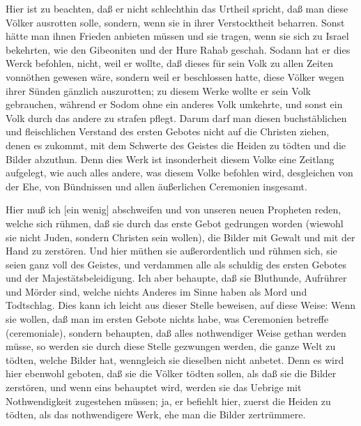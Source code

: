Hier ist zu beachten, daß er nicht schlechthin das Urtheil spricht, daß man diese Völker ausrotten solle, sondern, wenn sie in ihrer Verstocktheit beharren. Sonst hätte man ihnen Frieden anbieten müssen und sie tragen, wenn sie sich zu Israel bekehrten, wie den Gibeoniten und der Hure Rahab geschah. Sodann hat er dies Werck befohlen, nicht, weil er wollte, daß dieses für sein Volk zu allen Zeiten vonnöthen gewesen wäre, sondern weil er beschlossen hatte, diese Völker wegen ihrer Sünden gänzlich auszurotten; zu diesem Werke wollte er sein Volk gebrauchen, während er Sodom ohne ein anderes Volk umkehrte, und sonst ein Volk durch das andere zu strafen pflegt. Darum darf man diesen buchstäblichen und fleischlichen Verstand des ersten Gebotes nicht auf die Christen ziehen, denen es zukommt, mit dem Schwerte des Geistes die Heiden zu tödten und die Bilder abzuthun. Denn dies Werk ist insonderheit diesem Volke eine Zeitlang aufgelegt, wie auch alles andere, was diesem Volke befohlen wird, desgleichen von der Ehe, von Bündnissen und allen äußerlichen Ceremonien insgesamt.

Hier muß ich [ein wenig] abschweifen und von unseren neuen Propheten reden, welche sich rühmen, daß sie durch das erste Gebot gedrungen worden (wiewohl sie nicht Juden, sondern Christen sein wollen), die Bilder mit Gewalt und mit der Hand zu zerstören. Und hier müthen sie außerordentlich und rühmen sich, sie seien ganz voll des Geistes, und verdammen alle als schuldig des ersten Gebotes und der Majestätsbeleidigung. Ich aber behaupte, daß sie Bluthunde, Aufrührer und Mörder sind, welche nichts Anderes im Sinne haben als Mord und Todtschlag. Dies kann ich leicht aus dieser Stelle beweisen, auf diese Weise: Wenn sie wollen, daß man im ersten Gebote nichts habe, was Ceremonien betreffe (ceremoniale), sondern behaupten, daß alles nothwendiger Weise gethan werden müsse, so werden sie durch diese Stelle gezwungen werden, die ganze Welt zu tödten, welche Bilder hat, wenngleich sie dieselben nicht anbetet. Denn es wird hier ebenwohl geboten, daß sie die Völker tödten sollen, als daß sie die Bilder zerstören, und wenn eins behauptet wird, werden sie das Uebrige mit Nothwendigkeit zugestehen müssen; ja, er befiehlt hier, zuerst die Heiden zu tödten, als das nothwendigere Werk, ehe man die Bilder zertrümmere.

